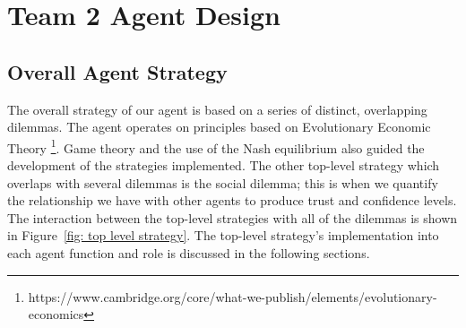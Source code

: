 \chapter{Team 2 Agent Design}
\section{Overall Agent Strategy}

The overall strategy of our agent is based on a series of distinct, overlapping dilemmas. The agent operates on principles based on Evolutionary Economic Theory \footnote{https://www.cambridge.org/core/what-we-publish/elements/evolutionary-economics}. Game theory and the use of the Nash equilibrium also guided the development of the strategies implemented. The other top-level strategy which overlaps with several dilemmas is the social dilemma; this is when we quantify the relationship we have with other agents to produce trust and confidence levels. The interaction between the top-level strategies with all of the dilemmas is shown in Figure~\ref{fig: top level strategy}. The top-level strategy's implementation into each agent function and role is discussed in the following sections. 

